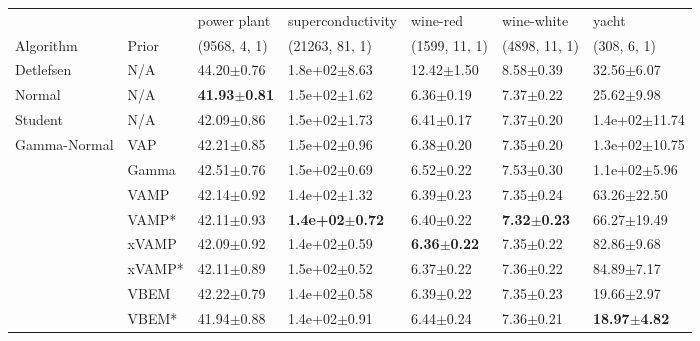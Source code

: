 \begin{tabular}{lllllll}
             &       &              power plant &          superconductivity &                wine-red &              wine-white &                    yacht \\
Algorithm & Prior& (9568, 4, 1)& (21263, 81, 1)& (1599, 11, 1)& (4898, 11, 1)& (308, 6, 1)\\
\midrule
Detlefsen & N/A &           44.20$\pm$0.76 &           1.8e+02$\pm$8.63 &          12.42$\pm$1.50 &           8.58$\pm$0.39 &           32.56$\pm$6.07 \\
Normal & N/A &  \textbf{41.93$\pm$0.81} &           1.5e+02$\pm$1.62 &           6.36$\pm$0.19 &           7.37$\pm$0.22 &           25.62$\pm$9.98 \\
Student & N/A &           42.09$\pm$0.86 &           1.5e+02$\pm$1.73 &           6.41$\pm$0.17 &           7.37$\pm$0.20 &        1.4e+02$\pm$11.74 \\
Gamma-Normal & VAP &           42.21$\pm$0.85 &           1.5e+02$\pm$0.96 &           6.38$\pm$0.20 &           7.35$\pm$0.20 &        1.3e+02$\pm$10.75 \\
             & Gamma &           42.51$\pm$0.76 &           1.5e+02$\pm$0.69 &           6.52$\pm$0.22 &           7.53$\pm$0.30 &         1.1e+02$\pm$5.96 \\
             & VAMP &           42.14$\pm$0.92 &           1.4e+02$\pm$1.32 &           6.39$\pm$0.23 &           7.35$\pm$0.24 &          63.26$\pm$22.50 \\
             & VAMP* &           42.11$\pm$0.93 &  \textbf{1.4e+02$\pm$0.72} &           6.40$\pm$0.22 &  \textbf{7.32$\pm$0.23} &          66.27$\pm$19.49 \\
             & xVAMP &           42.09$\pm$0.92 &           1.4e+02$\pm$0.59 &  \textbf{6.36$\pm$0.22} &           7.35$\pm$0.22 &           82.86$\pm$9.68 \\
             & xVAMP* &           42.11$\pm$0.89 &           1.5e+02$\pm$0.52 &           6.37$\pm$0.22 &           7.36$\pm$0.22 &           84.89$\pm$7.17 \\
             & VBEM &           42.22$\pm$0.79 &           1.4e+02$\pm$0.58 &           6.39$\pm$0.22 &           7.35$\pm$0.23 &           19.66$\pm$2.97 \\
             & VBEM* &           41.94$\pm$0.88 &           1.4e+02$\pm$0.91 &           6.44$\pm$0.24 &           7.36$\pm$0.21 &  \textbf{18.97$\pm$4.82} \\
\bottomrule
\end{tabular}

